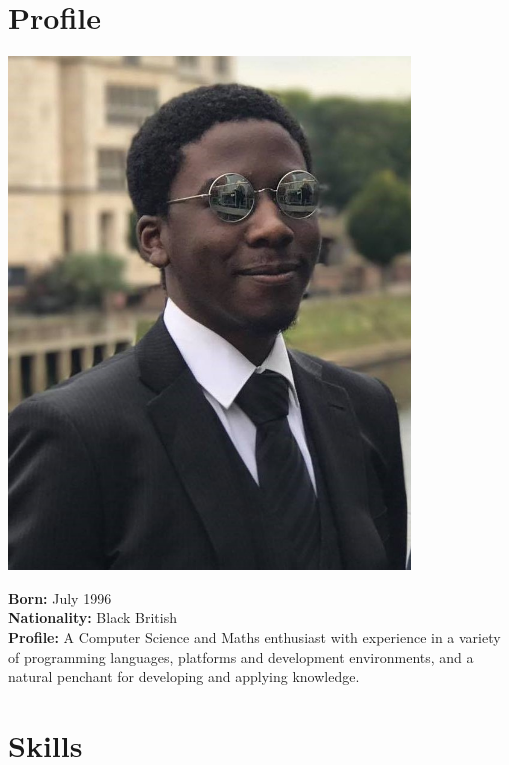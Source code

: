 \documentclass[a4paper]{cv}
\begin{document}
	\begin{minipage}[t]{0.33\textwidth} %
		
		\section{Profile}
		
		\includegraphics[width=0.8\textwidth]{cv.jpg}
		
		\begin{minipage}[t]{0.8\textwidth}
			\textbf{Born:} \small July 1996 \\
			\textbf{Nationality:} \small Black British \\
			\textbf{Profile:} \small A Computer Science and Maths enthusiast with experience in a variety of programming languages, platforms and development environments, and a natural penchant for developing and applying knowledge.
		\end{minipage}
		
		
		\section{Skills}
		

\end{minipage}
\end{document}
